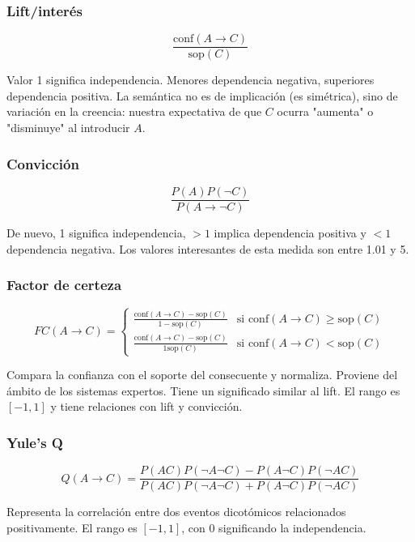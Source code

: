 \documentclass[a4paper,11pt,spanish]{report}
\let\stdsubsub\subsubsection
\renewcommand{\subsection}{\stdsubsub}
\begin{document}
\subsection*{Lift/interés}
\label{sec-4-2-1-3}

$$\frac{\mbox{conf}(A\rightarrow C)}{\mbox{sop}(C)}$$

Valor 1 significa independencia. Menores dependencia negativa, superiores dependencia positiva. La semántica no es de implicación (es simétrica), sino de variación en la creencia: nuestra expectativa de que $C$ ocurra "aumenta" o "disminuye" al introducir $A$.

\subsection*{Convicción}
\label{sec-4-2-1-4}

$$\frac{P(A)P(\neg C)}{P(A\rightarrow \neg C)}$$

De nuevo, 1 significa independencia, $>1$ implica dependencia positiva y $<1$ dependencia negativa. Los valores interesantes de esta medida son entre 1.01 y 5.

\subsection*{Factor de certeza}
\label{sec-4-2-1-5}

\[
\mathit{FC}(A\rightarrow C)=\begin{cases}
\frac{\mathrm{conf}(A\rightarrow C) - \mathrm{sop}(C)}{1 - \mathrm{sop}({C})} & \mbox{si }\mathrm{conf}(A\rightarrow C) \geq \mathrm{sop}(C) \\
\frac{\mathrm{conf}(A\rightarrow C) - \mathrm{sop}(C)}{1\mathrm{sop}(C)} & \mbox{si }\mathrm{conf}(A\rightarrow C) < \mathrm{sop}(C)
\end{cases}
\]

Compara la confianza con el soporte del consecuente y normaliza. Proviene del ámbito de los sistemas expertos.  Tiene un significado similar al lift. El rango es $[-1,1]$ y tiene relaciones con lift y convicción.

\subsection*{Yule's Q}
\label{sec-4-2-1-6}

$$Q(A\rightarrow C)=\frac{P(AC)P(\neg A\neg C)-P(A \neg C)P(\neg A C)}{P(AC)P(\neg A\neg C)+P(A \neg C)P(\neg A C)}$$

Representa la correlación entre dos eventos dicotómicos relacionados positivamente. El rango es $[-1,1]$, con 0 significando la independencia.
\end{document}
